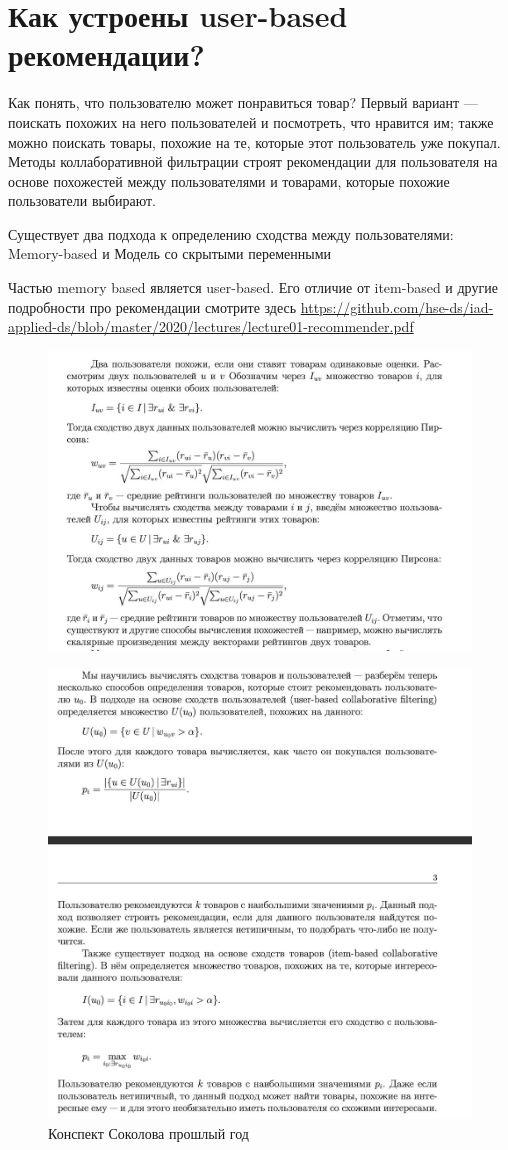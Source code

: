 \section{Как устроены user-based рекомендации?
} 
	
	Как понять, что пользователю может понравиться товар? Первый вариант — поискать похожих на него пользователей и посмотреть, что нравится им; также можно поискать товары, похожие на те, которые этот пользователь уже покупал. Методы коллаборативной фильтрации строят рекомендации для пользователя на основе похожестей между пользователями и товарами, которые похожие пользователи выбирают.
	

	Существует два подхода к определению сходства между пользователями: Memory-based и Модель со скрытыми переменными
	
    Частью memory based является user-based. Его отличие от item-based и другие подробности про рекомендации смотрите здесь \url{https://github.com/hse-ds/iad-applied-ds/blob/master/2020/lectures/lecture01-recommender.pdf}
	
		
		\begin{figure}[H]
\centering
\includegraphics[width=0.7\linewidth]{16_memory1.jpg}
\label{fig:16_memory1} 
\end{figure}
	
			\begin{figure}[H]
\centering
\includegraphics[width=0.7\linewidth]{16_memory2.jpg}
\caption{Конспект Соколова прошлый год}
\label{fig:16_memory2} 
\end{figure}
